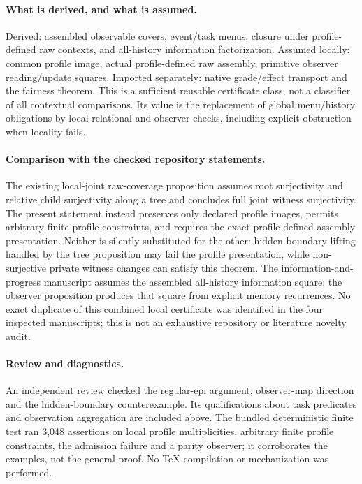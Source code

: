 \documentclass[11pt]{article}
\begin{document}
\paragraph{What is derived, and what is assumed.} Derived: assembled observable covers, event/task menus, closure under profile-defined raw contexts, and all-history information factorization. Assumed locally: common profile image, actual profile-defined raw assembly, primitive observer reading/update squares. Imported separately: native grade/effect transport and the fairness theorem. This is a sufficient reusable certificate class, not a classifier of all contextual comparisons. Its value is the replacement of global menu/history obligations by local relational and observer checks, including explicit obstruction when locality fails.

\paragraph{Comparison with the checked repository statements.} The existing local-joint raw-coverage proposition assumes root surjectivity and relative child surjectivity along a tree and concludes full joint witness surjectivity. The present statement instead preserves only declared profile images, permits arbitrary finite profile constraints, and requires the exact profile-defined assembly presentation. Neither is silently substituted for the other: hidden boundary lifting handled by the tree proposition may fail the profile presentation, while non-surjective private witness changes can satisfy this theorem. The information-and-progress manuscript assumes the assembled all-history information square; the observer proposition produces that square from explicit memory recurrences. No exact duplicate of this combined local certificate was identified in the four inspected manuscripts; this is not an exhaustive repository or literature novelty audit.

\paragraph{Review and diagnostics.} An independent review checked the regular-epi argument, observer-map direction and the hidden-boundary counterexample. Its qualifications about task predicates and observation aggregation are included above. The bundled deterministic finite test ran 3,048 assertions on local profile multiplicities, arbitrary finite profile constraints, the admission failure and a parity observer; it corroborates the examples, not the general proof. No TeX compilation or mechanization was performed.
\end{document}
